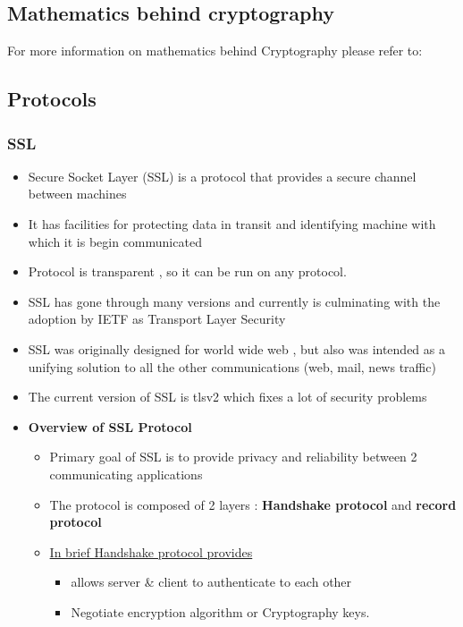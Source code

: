 \documentclass[a4paper]{article}
\begin{document}
\subsection{Mathematics behind cryptography}
    For more information on mathematics behind Cryptography please refer to: ~\cite{RedHat:huzaifs}
\subsection{Protocols}
\subsubsection{SSL}
    \begin{itemize}
        \item Secure Socket Layer (SSL) is a protocol that provides a secure channel between machines
        \item It has facilities for protecting data in transit and identifying machine with which it is begin communicated
        \item Protocol is transparent , so it can be run on any protocol. 
        \item SSL has gone through many versions and currently is culminating with the adoption by IETF as Transport Layer Security
        \item SSL was originally designed for world wide web , but also was intended as a unifying solution to all the other communications (web, mail, news traffic)
        \item The current version of SSL is tlsv2 which fixes a lot of security problems
        \item \textbf{Overview of SSL Protocol}
            \begin{itemize}
                \item Primary goal of SSL is to provide privacy and reliability between 2 communicating applications
                \item The protocol is composed of 2 layers : \textbf{Handshake protocol} and \textbf{record protocol}
                \item \underline{In brief Handshake protocol provides}
                    \begin{itemize}
                        \item allows server \& client to authenticate to each other
                        \item Negotiate encryption algorithm or Cryptography keys. 
                    \end{itemize}

\end{itemize}
\end{itemize}
\end{document}
